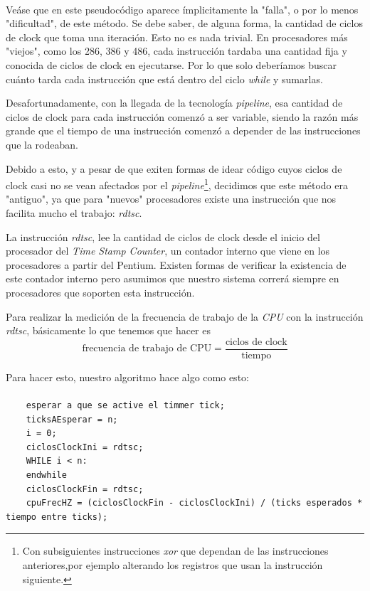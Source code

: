 \documentclass[a4paper,10pt]{article}
\begin{document}
    \paragraph*{}
    Veáse que en este pseudocódigo aparece ímplicitamente la "falla", o por lo menos "dificultad", de este método. Se debe saber, de alguna forma, la cantidad de ciclos
    de clock que toma una iteración. Esto no es nada trivial. En procesadores más "viejos", como los 286, 386 y 486, cada instrucción tardaba una cantidad fija y conocida
    de ciclos de clock en ejecutarse. Por lo que solo deberíamos buscar cuánto tarda cada instrucción que está dentro  del ciclo \textit{while} y sumarlas.

    Desafortunadamente, con la llegada de la tecnología \textit{pipeline}, esa cantidad de ciclos de clock para cada instrucción comenzó a ser variable, siendo la 
    razón más grande que el tiempo de una instrucción comenzó a depender de las instrucciones que la rodeaban.

    Debido a esto, y a pesar de que exiten formas de idear código cuyos ciclos de clock casi no se vean afectados por el \textit{pipeline}\footnote{ Con 
    subsiguientes instrucciones \textit{xor} que dependan de las instrucciones anteriores,por ejemplo alterando los registros que usan la instrucción siguiente.}, 
    decidimos que este método era "antiguo", ya que para "nuevos" procesadores existe una instrucción que nos facilita mucho el trabajo: \textit{rdtsc}.

    La instrucción \textit{rdtsc}, lee la cantidad de ciclos de clock desde el inicio del procesador del \textit{Time Stamp Counter}, un contador interno que viene
    en los procesadores a partir del Pentium. Existen formas de verificar la existencia de este contador interno pero asumimos que nuestro sistema correrá siempre en
    procesadores que soporten esta instrucción.

    Para realizar la medición de la frecuencia de trabajo de la \textit{CPU} con la instrucción \textit{rdtsc}, básicamente lo que tenemos que hacer es 
    \[  \text{frecuencia de trabajo de CPU} = \dfrac{\text{ciclos de clock}}{\text{tiempo}} \]
    
    Para hacer esto, nuestro algoritmo hace algo como esto:
    \paragraph*{}
    \begin{lstlisting}
    esperar a que se active el timmer tick;
    ticksAEsperar = n;
    i = 0;
    ciclosClockIni = rdtsc;
    WHILE i < n:
    endwhile
    ciclosClockFin = rdtsc;
    cpuFrecHZ = (ciclosClockFin - ciclosClockIni) / (ticks esperados * tiempo entre ticks);
    \end{lstlisting}
\end{document}
